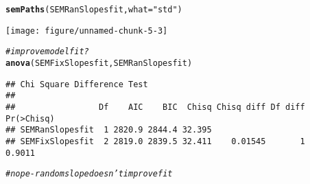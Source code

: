 \documentclass{article}\usepackage[]{graphicx}\usepackage[]{color}
\makeatletter
\def\maxwidth{ %
  \ifdim\Gin@nat@width>\linewidth
    \linewidth
  \else
    \Gin@nat@width
  \fi
}
\newcommand{\hlstr}[1]{\textcolor[rgb]{0.192,0.494,0.8}{#1}}%
\newcommand{\hlcom}[1]{\textcolor[rgb]{0.678,0.584,0.686}{\textit{#1}}}%
\newcommand{\hlstd}[1]{\textcolor[rgb]{0.345,0.345,0.345}{#1}}%
\newcommand{\hlkwc}[1]{\textcolor[rgb]{0.333,0.667,0.333}{#1}}%
\newcommand{\hlkwd}[1]{\textcolor[rgb]{0.737,0.353,0.396}{\textbf{#1}}}%
\newenvironment{kframe}{%
 \def\at@end@of@kframe{}%
 \ifinner\ifhmode%
  \def\at@end@of@kframe{\end{minipage}}%
  \begin{minipage}{\columnwidth}%
 \fi\fi%
 \def\FrameCommand##1{\hskip\@totalleftmargin \hskip-\fboxsep
 \colorbox{shadecolor}{##1}\hskip-\fboxsep
     \hskip-\linewidth \hskip-\@totalleftmargin \hskip\columnwidth}%
 \MakeFramed {\advance\hsize-\width
   \@totalleftmargin\z@ \linewidth\hsize
   \@setminipage}}%
 {\par\unskip\endMakeFramed%
 \at@end@of@kframe}
\newenvironment{knitrout}{}{} %
\makeatother
\begin{document}
\begin{knitrout}
\begin{kframe}
\begin{alltt}
\hlkwd{semPaths}\hlstd{(SEMRanSlopesfit,} \hlkwc{what} \hlstd{=} \hlstr{"std"}\hlstd{)}
\end{alltt}
\end{kframe}
\texttt{[image: figure/unnamed-chunk-5-3]} 
\begin{kframe}\begin{alltt}
\hlcom{# improve model fit?}
\hlkwd{anova}\hlstd{(SEMFixSlopesfit, SEMRanSlopesfit)}
\end{alltt}
\begin{verbatim}
## Chi Square Difference Test
## 
##                 Df    AIC    BIC  Chisq Chisq diff Df diff Pr(>Chisq)
## SEMRanSlopesfit  1 2820.9 2844.4 32.395                              
## SEMFixSlopesfit  2 2819.0 2839.5 32.411    0.01545       1     0.9011
\end{verbatim}
\begin{alltt}
\hlcom{# nope - random slope doesn't improve fit}


\end{alltt}
\end{kframe}
\end{knitrout}
\end{document}
